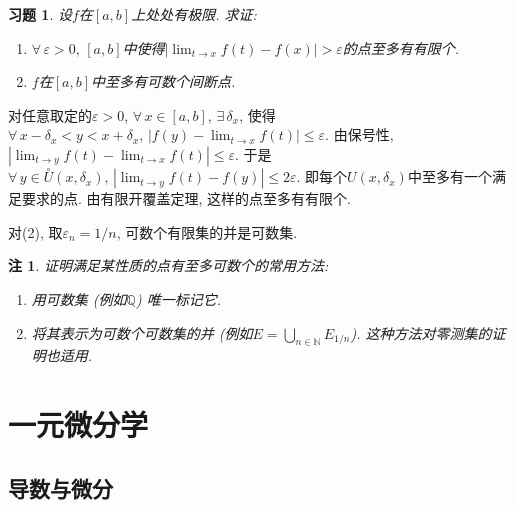 \documentclass[11pt,a4paper]{ctexart}
\makeatletter
\theoremstyle{thmseries} %
\newtheorem{thm}{定理}[section]
\theoremstyle{exerseries}
\newtheorem{exer}{习题}[section]
\newtheorem*{rem}{注}
\renewenvironment{proof}[1][\proofname]{\par
  \pushQED{\qed}%
  \normalfont \topsep6\p@\@plus6\p@\relax
  \trivlist
  \item[\hskip\labelsep
        \itshape
    #1\@addpunct{}]\ignorespaces
}{%
  \popQED\endtrivlist\@endpefalse
}
\newenvironment{pf}{\begin{proof}[\bfseries\upshape 证\quad]}{\end{proof}}
\newcommand{\bra}[1]{\mathopen{}\left(#1\right)}
\renewcommand{\epsilon}{\varepsilon}
\renewcommand{\phi}{\varphi}
\newcommand{\dnei}{\overset{\circ}{U}}
\newcommand{\N}{\mathbb{N}}
\newcommand{\Q}{\mathbb{Q}}
\makeatother
\begin{document}
\begin{exer}
	设$f$在$[a,b]$上处处有极限. 求证:
	\begin{enumerate}
		\item $\forall\,\epsilon>0,\,[a,b]$中使得$|\lim_{t\to x}f(t)-f(x)|>\epsilon$的点至多有有限个. 
		\item $f$在$[a,b]$中至多有可数个间断点. 
	\end{enumerate}
\end{exer}
\begin{pf}
	对任意取定的$\epsilon>0$, $\forall\,x\in[a,b],\,\exists\,\delta_x$, 使得$\forall\,x-\delta_x<y<x+\delta_x,\,|f(y)-\lim_{t\to x}f(t)|\leq\epsilon$. 由保号性, $|\lim_{t\to y}f(t)-\lim_{t\to x}f(t)|\leq\epsilon$. 于是$\forall\,y\in\dnei(x,\delta_x),\,|\lim_{t\to y}f(t)-f(y)|\leq2\epsilon$. 即每个$U(x,\delta_x)$中至多有一个满足要求的点. 由有限开覆盖定理, 这样的点至多有有限个. 

	对(2), 取$\epsilon_n=1/n$, 可数个有限集的并是可数集. 
\end{pf}
\begin{rem}
	证明满足某性质的点有至多可数个的常用方法:
	\begin{enumerate}
		\item 用可数集 (例如$\Q$) 唯一标记它. 
		\item 将其表示为可数个可数集的并 (例如$\textstyle E=\bigcup_{n\in \N}E_{1/n}$). 这种方法对零测集的证明也适用. 
	\end{enumerate}
\end{rem}


\section{一元微分学}
\subsection{导数与微分}

\end{document}
